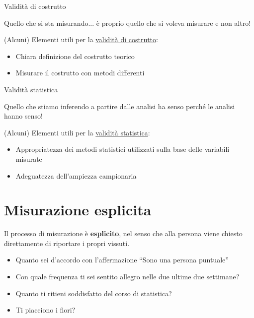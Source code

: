 \documentclass{beamer}
\begin{document}
\begin{frame}
	
	\begin{block}{Validità di costrutto}
		
		Quello che si sta misurando... è proprio quello che si voleva misurare e non altro!
		
		(Alcuni) Elementi utili per la \underline{validità di costrutto}:
		\begin{itemize}
			\item Chiara definizione del costrutto teorico
			\item Misurare il costrutto con metodi differenti
		\end{itemize} 
	\end{block}	
	
	\pause
	\begin{block}{Validità statistica}
		
		Quello che stiamo inferendo a partire dalle analisi ha senso perché le analisi hanno senso! 
		
		(Alcuni) Elementi utili per la \underline{validità statistica}:
		\begin{itemize}
			\item Appropriatezza dei metodi statistici utilizzati sulla base delle variabili misurate
			\item Adeguatezza dell'ampiezza campionaria
		\end{itemize} 
		
	\end{block}
\end{frame}


\section[Misurazione esplicita]{Misurazione esplicita}

\begin{frame}
	Il processo di misurazione è \textbf{esplicito}, nel senso che alla persona viene chiesto direttamente di riportare i propri vissuti.
	
	\begin{exampleblock}{}
		
		\begin{itemize}
			\item Quanto sei d'accordo con l'affermazione ``Sono una persona puntuale''
			\item Con quale frequenza ti sei sentito allegro nelle due ultime due settimane? 
			\item Quanto ti ritieni soddisfatto del corso di statistica? 
			\item Ti piacciono i fiori?
		\end{itemize}
	\end{exampleblock}
\end{frame}
\end{document}
